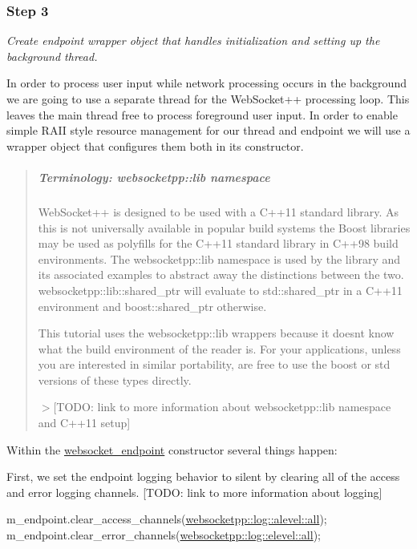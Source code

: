 \subsubsection*{Step 3}

{\itshape Create endpoint wrapper object that handles initialization and setting up the background thread.}

In order to process user input while network processing occurs in the background we are going to use a separate thread for the Web\+Socket++ processing loop. This leaves the main thread free to process foreground user input. In order to enable simple R\+A\+II style resource management for our thread and endpoint we will use a wrapper object that configures them both in its constructor.

\begin{quote}
\subparagraph*{Terminology\+: websocketpp\+::lib namespace}

Web\+Socket++ is designed to be used with a C++11 standard library. As this is not universally available in popular build systems the Boost libraries may be used as polyfills for the C++11 standard library in C++98 build environments. The {\ttfamily websocketpp\+::lib} namespace is used by the library and its associated examples to abstract away the distinctions between the two. {\ttfamily websocketpp\+::lib\+::shared\+\_\+ptr} will evaluate to {\ttfamily std\+::shared\+\_\+ptr} in a C++11 environment and {\ttfamily boost\+::shared\+\_\+ptr} otherwise.

This tutorial uses the {\ttfamily websocketpp\+::lib} wrappers because it doesn\textquotesingle{}t know what the build environment of the reader is. For your applications, unless you are interested in similar portability, are free to use the boost or std versions of these types directly.

$>$\mbox{[}T\+O\+DO\+: link to more information about websocketpp\+::lib namespace and C++11 setup\mbox{]} \end{quote}


Within the {\ttfamily \hyperlink{classwebsocket__endpoint}{websocket\+\_\+endpoint}} constructor several things happen\+:

First, we set the endpoint logging behavior to silent by clearing all of the access and error logging channels. \mbox{[}T\+O\+DO\+: link to more information about logging\mbox{]} 
\begin{DoxyCode}
m\_endpoint.clear\_access\_channels(\hyperlink{structwebsocketpp_1_1log_1_1alevel_a853aa0b8976e53f3181af3bc398d493e}{websocketpp::log::alevel::all});
m\_endpoint.clear\_error\_channels(\hyperlink{structwebsocketpp_1_1log_1_1elevel_a9b31ff708c221d314f9f4eb3ff2b1ad7}{websocketpp::log::elevel::all});
\end{DoxyCode}


